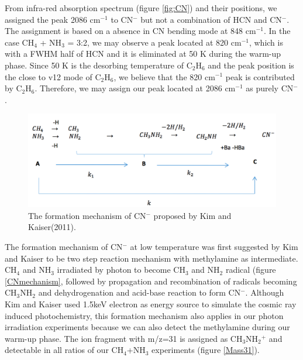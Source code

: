 From infra-red absorption spectrum (figure \ref{fig:CN}) and their positions, we assigned the peak 2086 cm$^{-1}$ to CN$^-$  but not a combination of HCN and CN$^-$. The assignment is based on a absence in CN bending mode at 848 cm$^{-1}$. In the case CH$_4$ + NH$_3$ = 3:2, we may observe a peak located at 820 cm$^{-1}$, which is with a FWHM half of HCN and it is eliminated at 50 K during the warm-up phase. Since 50 K is the desorbing temperature of C$_2$H$_6$ and the peak position is the close to v12 mode of C$_2$H$_6$, we believe that the 820 cm$^{-1}$ peak is contributed by C$_2$H$_6$. Therefore, we may assign our peak located at 2086 cm$^{-1}$ as purely CN$^-$.\\

\begin{figure}
\centering
\includegraphics[width=\textwidth]{figures/chapter3/CNmechanism}
\caption{The formation mechanism of CN$^-$ proposed by Kim and Kaiser(2011). }
\label{fig:CNmechanism}
\end{figure}

The formation mechanism of CN$^-$ at low temperature was first suggested by Kim and Kaiser \cite{kim} to be two step reaction mechanism with methylamine as intermediate. CH$_4$ and NH$_3$ irradiated by photon to become CH$_3$ and NH$_2$ radical (figure \ref{CNmechanism}, followed by propagation and recombination of radicals becoming CH$_3$NH$_2$ and dehydrogenation and acid-base reaction to form CN$^-$.
Although Kim and Kaiser \cite{kim} used 1.5keV electron as energy source to simulate the cosmic ray induced photochemistry, this formation mechanism also applies in our photon irradiation experiments because we can also detect the methylamine during our warm-up phase. The ion fragment with m/z=31 is assigned as CH$_3$NH$_2$$^+$ and detectable in all ratios of our CH$_4$+NH$_3$ experiments (figure \ref{Mass31}).


